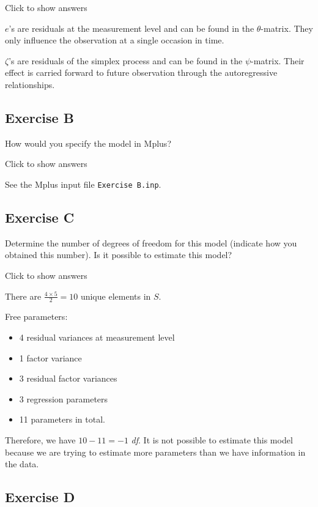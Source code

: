 \documentclass[
]{book}
\providecommand{\tightlist}{%
  \setlength{\itemsep}{0pt}\setlength{\parskip}{0pt}}
\begin{document}
Click to show answers

\(e\)'s are residuals at the measurement level and can be found in the \(\theta\)-matrix. They only influence the observation at a single occasion in time.

\(\zeta\)'s are residuals of the simplex process and can be found in the \(\psi\)-matrix. Their effect is carried forward to future observation through the autoregressive relationships.

\hypertarget{exercise-b}{%
\subsection{Exercise B}\label{exercise-b}}

How would you specify the model in Mplus?

Click to show answers

See the Mplus input file \texttt{Exercise\ B.inp}.

\hypertarget{exercise-c}{%
\subsection{Exercise C}\label{exercise-c}}

Determine the number of degrees of freedom for this model (indicate how you obtained this number). Is it possible to estimate this model?

Click to show answers

There are \(\frac{4 \times 5}{2} = 10\) unique elements in \(S\).

Free parameters:

\begin{itemize}
\tightlist
\item
  4 residual variances at measurement level
\item
  1 factor variance
\item
  3 residual factor variances
\item
  3 regression parameters
\item
  11 parameters in total.
\end{itemize}

Therefore, we have \(10 - 11 = -1\) \emph{df}. It is not possible to estimate this model because we are trying to estimate more parameters than we have information in the data.

\hypertarget{exercise-d}{%
\subsection{Exercise D}\label{exercise-d}}
\end{document}
